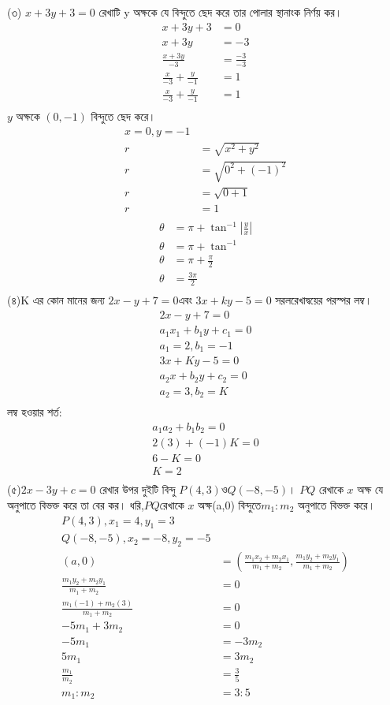 \documentclass{article}
\begin{document}
(৩) $x+3y+3=0$ রেখাটি y অক্ষকে যে বিন্দুতে ছেদ করে তার পোলার স্থানাংক নির্ণয় কর।
\begin{align*}
	x+3y+3&=0\\
	x+3y&=-3\\
	\frac{x+3y}{-3}&=\frac{-3}{-3}\\
	\frac{x}{-3}+\frac{y}{-1}&=1\\
	\frac{x}{-3}+\frac{y}{-1}&=1\\
\end{align*}
$y$ অক্ষকে $(0,-1)$ বিন্দুতে ছেদ করে। 
\begin{align*}
	x=0, y=-1\\
	r&=\sqrt{x^2+y^2}\\
	r&=\sqrt{0^2+(-1)^2}\\
	r&=\sqrt{0+1}\\
	r&=1\\
\end{align*}
\begin{align*}
	\theta&=\pi+\tan^{-1}|\frac{y}{x}|\\
	\theta&=\pi+\tan^{-1}\\
	\theta&=\pi+\frac{\pi}{2}\\
	\theta&=\frac{3\pi}{2}\\
\end{align*}
(৪)K এর কোন মানের জন্য  $2x-y+7=0$এবং $3x+ky-5=0$ সরলরেখাদ্বয়ের পরস্পর লম্ব।
\begin{align*}
	2x-y+7=0\\
	a_1x_1+b_1y+c_1=0\\
	a_1=2,b_1=-1\\
	3x+Ky-5=0\\
	a_2x+b_2y+c_2=0\\
	a_2=3,b_2=K\\
\end{align*}
লম্ব হওয়ার শর্ত:
\begin{align*}
	a_1a_2+b_1b_2=0\\
	2(3)+(-1)K=0\\
	6-K=0\\K=2\\
\end{align*}
(৫)$2x-3y+c=0$ রেখার উপর দুইটি বিন্দু $P(4,3)$ও$Q(-8,-5)$। $PQ$ রেখাকে $x$ অক্ষ যে অনুপাতে বিভক্ত করে তা বের কর।
ধরি,$PQ$রেখাকে $x$ অক্ষ(a,0) বিন্দুতে$m_1:m_2$ অনুপাতে বিভক্ত করে।
\begin{align*}
	P(4,3), x_1=4, y_1=3\\
	Q(-8,-5) ,x_2=-8 ,y_2=-5\\
	(a,0)&=\left(\frac{m_1x_2+m_2x_1}{m_1+m_2},\frac{m_1y_2+m_2y_1}{m_1+m_2}\right)\\
	\frac{m_1y_2+m_2y_1}{m_1+m_2}&=0\\ 
	\frac{m_1(-1)+m_2(3)}{m_1+m_2}&=0\\
	-5m_1+3m_2&=0\\
	-5m_1&=-3m_2\\
	5m_1&=3m_2\\
	\frac{m_1}{m_2}&=\frac{3}{5}\\
	m_1:m_2&=3:5\\
\end{align*}
\end{document}
